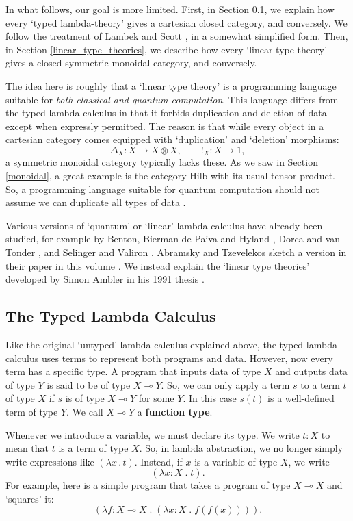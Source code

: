 \documentclass[12pt]{article}
\newcommand{\Hilb}{\mathrm{Hilb}}
\newcommand{\maps}{\colon}
\newcommand{\lhom}{\multimap}
\newcommand{\tensor}{\otimes}
\begin{document}
In what follows, our goal is more limited.  First, in Section
\ref{lambda}, we explain how every `typed lambda-theory' gives a
cartesian closed category, and conversely.  We follow the treatment of
Lambek and Scott \cite{LS}, in a somewhat simplified form.  Then, in
Section \ref{linear_type_theories}, we describe how every `linear type
theory' gives a closed symmetric monoidal category, and conversely.

The idea here is roughly that a `linear type theory' is a programming 
language suitable for {\it both classical and quantum computation}.  This
language differs from the typed lambda calculus in that it forbids
duplication and deletion of data except when expressly permitted.  The
reason is that while every object in a cartesian category comes
equipped with `duplication' and `deletion' morphisms:
\[   \Delta_X \maps X \to X \tensor X, \qquad !_X \maps X \to 1 , \]
a symmetric monoidal category typically lacks these.  As we saw in
Section \ref{monoidal}, a great example is the category $\Hilb$ with
its usual tensor product.  So, a programming language suitable for
quantum computation should not assume we can duplicate all types
of data \cite{ChuangNielsen,WZ}.

Various versions of `quantum' or `linear' lambda calculus have already
been studied, for example by Benton, Bierman de Paiva and Hyland
\cite{BBPH}, Dorca and van Tonder \cite{vT}, and Selinger and Valiron
\cite{SV}.  Abramsky and Tzevelekos sketch a version in their paper in
this volume \cite{AT}.  We instead explain the `linear type theories'
developed by Simon Ambler in his 1991 thesis \cite{Ambler}.

\subsection{The Typed Lambda Calculus}
\label{lambda}

Like the original `untyped' lambda calculus explained above, the typed
lambda calculus uses terms to represent both programs and data.
However, now every term has a specific type.  A program that inputs
data of type $X$ and outputs data of type $Y$ is said to be of type $X
\lhom Y$.  So, we can only apply a term $s$ to a term $t$ of type $X$
if $s$ is of type $X \lhom Y$ for some $Y$.  In this case $s(t)$ is a
well-defined term of type $Y$.  We call $X \lhom Y$ a {\bf function
type}.

Whenever we introduce a variable, we must declare its type.  We write
$t\!:\!X$ to mean that $t$ is a term of type $X$.  So, in lambda
abstraction, we no longer simply write expressions like $(\lambda
x\, . \,t)$.  Instead, if $x$ is a variable of type $X$, we write
\[      (\lambda x\!:\!X \; .\; t) . \] 
For example, here is a simple program that
takes a program of type $X \lhom X$ and `squares' it:
\[       (\lambda f\!:\!X \lhom X \;.\;(\lambda \!x:\!X \; . \; f(f(x)))) .\]
\end{document}
